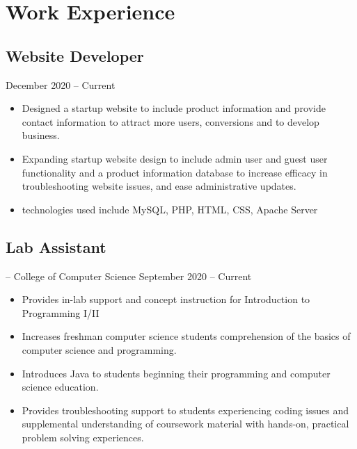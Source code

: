 \documentclass[12pt]{article}
\begin{document}
\section{Work Experience}

\subsection{Website Developer}\hfill December 2020 -- Current
\begin{itemize}[label=]
    \item  Designed a startup website to include product information and provide contact information to attract more users, conversions and to develop business.

    \item Expanding startup website design to include admin user and guest user functionality and a product information database to increase efficacy in troubleshooting website issues, and ease administrative updates.

    \item technologies used include MySQL, PHP, HTML, CSS, Apache Server
\end{itemize}


\subsection{Lab Assistant} \hspace{-.5em}-- College of Computer Science \hfill September 2020 -- Current

\begin{itemize}[label=]
    \item  Provides in-lab support and concept instruction for Introduction to Programming I/II

    \item Increases freshman computer science students comprehension of the basics of computer science and programming.

    \item Introduces Java to students beginning their programming and computer science education.

    \item Provides troubleshooting support to students experiencing coding issues and supplemental understanding of coursework material with hands-on, practical problem solving experiences.

\end{itemize}
\end{document}

